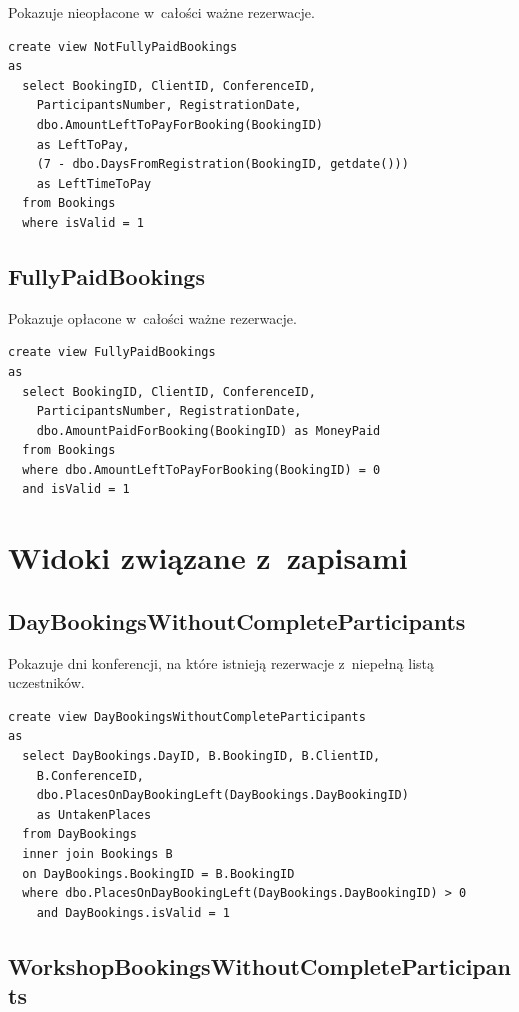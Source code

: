 \documentclass[12pt, a4paper]{mwrep}
\begin{document}
\noindent Pokazuje nieopłacone w~całości ważne rezerwacje.

\begin{lstlisting}
create view NotFullyPaidBookings
as
  select BookingID, ClientID, ConferenceID, 
    ParticipantsNumber, RegistrationDate,
    dbo.AmountLeftToPayForBooking(BookingID) 
    as LeftToPay, 
    (7 - dbo.DaysFromRegistration(BookingID, getdate())) 
    as LeftTimeToPay
  from Bookings
  where isValid = 1
\end{lstlisting}

\subsection{FullyPaidBookings}

\noindent Pokazuje opłacone w~całości ważne rezerwacje.

\begin{lstlisting}
create view FullyPaidBookings
as
  select BookingID, ClientID, ConferenceID, 
    ParticipantsNumber, RegistrationDate,
    dbo.AmountPaidForBooking(BookingID) as MoneyPaid
  from Bookings
  where dbo.AmountLeftToPayForBooking(BookingID) = 0
  and isValid = 1
\end{lstlisting}

\section{Widoki związane z~zapisami}

\subsection{DayBookingsWithoutCompleteParticipants}

\noindent Pokazuje dni konferencji, na które istnieją rezerwacje z~niepełną listą uczestników.

\begin{lstlisting}
create view DayBookingsWithoutCompleteParticipants
as
  select DayBookings.DayID, B.BookingID, B.ClientID, 
    B.ConferenceID, 
    dbo.PlacesOnDayBookingLeft(DayBookings.DayBookingID) 
    as UntakenPlaces
  from DayBookings
  inner join Bookings B 
  on DayBookings.BookingID = B.BookingID
  where dbo.PlacesOnDayBookingLeft(DayBookings.DayBookingID) > 0
    and DayBookings.isValid = 1
\end{lstlisting}

\subsection{WorkshopBookingsWithoutCompleteParticipants}
\end{document}
